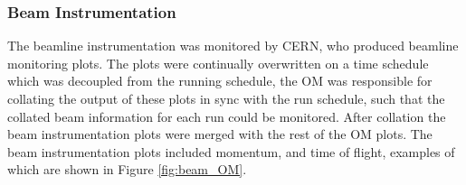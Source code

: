 \subsubsection*{Beam Instrumentation}
The beamline instrumentation was monitored by CERN, who produced beamline
monitoring plots\cite{Booth:2019brj}. The plots were continually overwritten 
on a time schedule which was decoupled from the \protodune{} running schedule, 
the OM was responsible for collating the output of these plots in sync with 
the \protodune{} run schedule, such that the collated beam information for 
each run could be monitored. After collation the beam instrumentation plots 
were merged with the rest of the OM plots. The beam instrumentation plots 
included momentum, and time of flight, examples of which are shown in 
Figure \ref{fig:beam_OM}.

